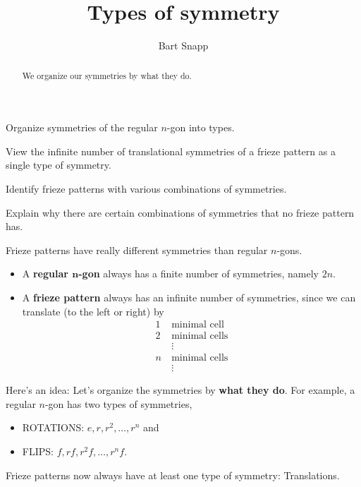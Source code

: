\documentclass[noauthor,nooutcomes,hints,handout]{../ximera}
\author{Bart Snapp}
\title{Types of symmetry}
\begin{document}
\begin{abstract}
  We organize our symmetries by what they do.
\end{abstract}
\maketitle

\begin{listOutcomes}
\item Organize symmetries of the regular $n$-gon into types.
\item View the infinite number of translational symmetries of a frieze
  pattern as a single type of symmetry.
\item Identify frieze patterns with various combinations of
  symmetries.
\item Explain why there are certain combinations of symmetries that no
  frieze pattern has.
\end{listOutcomes}

Frieze patterns have really different symmetries than regular
$n$-gons.
\begin{itemize}
  \item A \textbf{regular $\boldsymbol n$-gon} always has a finite
    number of symmetries, namely $2n$.
  \item A \textbf{frieze pattern} always has an infinite number of symmetries,
    since we can translate (to the left or right) by
    \begin{align*}
      1\ &\text{minimal cell}\\
      2\ &\text{minimal cells}\\
      &\vdots \\
      n\ &\text{minimal cells}\\
      &\vdots
    \end{align*}
\end{itemize}
Here's an idea: Let's organize the symmetries by \textbf{what they
  do}. For example, a regular $n$-gon has two types of symmetries,
\begin{itemize}
\item ROTATIONS: $e,r,r^2,\dots,r^n$ and
\item FLIPS: $f,rf,r^2f,\dots,r^nf$.
\end{itemize}

Frieze patterns now always have at least one type of symmetry:
Translations.
\end{document}

